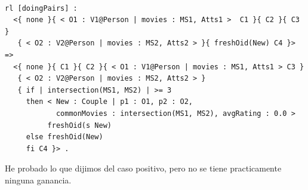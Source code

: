  

\begin{lstlisting}[caption=\code{doingCouples} Maude rule., label=lst:task2SecondVersion]

rl [doingPairs] :
  <{ none }{ < O1 : V1@Person | movies : MS1, Atts1 >  C1 }{ C2 }{ C3 }
   { < O2 : V2@Person | movies : MS2, Atts2 > }{ freshOid(New) C4 }>
=> 
  <{ none }{ C1 }{ C2 }{ < O1 : V1@Person | movies : MS1, Atts1 > C3 }
   { < O2 : V2@Person | movies : MS2, Atts2 > }
   { if | intersection(MS1, MS2) | >= 3 
     then < New : Couple | p1 : O1, p2 : O2, 
            commonMovies : intersection(MS1, MS2), avgRating : 0.0 >
          freshOid(s New)
     else freshOid(New)
     fi C4 }> .
\end{lstlisting}
He probado lo que dijimos del caso positivo, pero no se tiene practicamente ninguna ganancia.